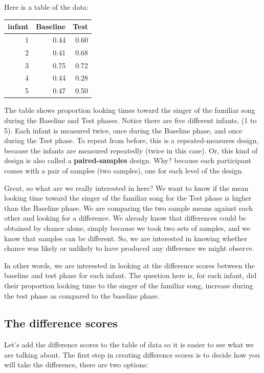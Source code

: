 \documentclass[
]{book}
\begin{document}
Here is a table of the data:

\begin{tabular}{r|r|r}
\hline
infant & Baseline & Test\\
\hline
1 & 0.44 & 0.60\\
\hline
2 & 0.41 & 0.68\\
\hline
3 & 0.75 & 0.72\\
\hline
4 & 0.44 & 0.28\\
\hline
5 & 0.47 & 0.50\\
\hline
\end{tabular}

The table shows proportion looking times toward the singer of the familiar song during the Baseline and Test phases. Notice there are five different infants, (1 to 5). Each infant is measured twice, once during the Baseline phase, and once during the Test phase. To repeat from before, this is a repeated-measures design, because the infants are measured repeatedly (twice in this case). Or, this kind of design is also called a \textbf{paired-samples} design. Why? because each participant comes with a pair of samples (two samples), one for each level of the design.

Great, so what are we really interested in here? We want to know if the mean looking time toward the singer of the familiar song for the Test phase is higher than the Baseline phase. We are comparing the two sample means against each other and looking for a difference. We already know that differences could be obtained by chance alone, simply because we took two sets of samples, and we know that samples can be different. So, we are interested in knowing whether chance was likely or unlikely to have produced any difference we might observe.

In other words, we are interested in looking at the difference scores between the baseline and test phase for each infant. The question here is, for each infant, did their proportion looking time to the singer of the familiar song, increase during the test phase as compared to the baseline phase.

\subsection{The difference scores}\label{the-difference-scores-1}

Let's add the difference scores to the table of data so it is easier to see what we are talking about. The first step in creating difference scores is to decide how you will take the difference, there are two options:
\end{document}
